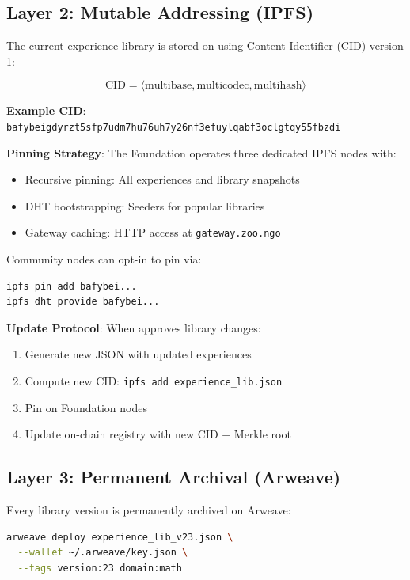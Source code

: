 \subsection{Layer 2: Mutable Addressing (IPFS)}

The current experience library is stored on \IPFS{} using Content Identifier (CID) version 1:

\begin{equation}
\text{CID} = \langle \text{multibase}, \text{multicodec}, \text{multihash} \rangle
\end{equation}

\textbf{Example CID}: \texttt{bafybeigdyrzt5sfp7udm7hu76uh7y26nf3efuylqabf3oclgtqy55fbzdi}

\textbf{Pinning Strategy}: The \Zoo{} Foundation operates three dedicated IPFS nodes with:
\begin{itemize}
    \item Recursive pinning: All experiences and library snapshots
    \item DHT bootstrapping: Seeders for popular libraries
    \item Gateway caching: HTTP access at \texttt{gateway.zoo.ngo}
\end{itemize}

Community nodes can opt-in to pin via:
\begin{lstlisting}[language=bash]
ipfs pin add bafybei...
ipfs dht provide bafybei...
\end{lstlisting}

\textbf{Update Protocol}: When \DAO{} approves library changes:
\begin{enumerate}
    \item Generate new JSON with updated experiences
    \item Compute new CID: \texttt{ipfs add experience\_lib.json}
    \item Pin on Foundation nodes
    \item Update on-chain registry with new CID + Merkle root
\end{enumerate}

\subsection{Layer 3: Permanent Archival (Arweave)}

Every library version is permanently archived on Arweave:

\begin{lstlisting}[language=bash]
arweave deploy experience_lib_v23.json \
  --wallet ~/.arweave/key.json \
  --tags version:23 domain:math
\end{lstlisting}

